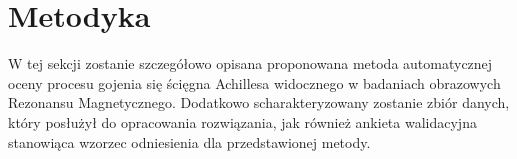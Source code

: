    







\section{Metodyka}

W tej sekcji zostanie szczegółowo opisana proponowana metoda automatycznej oceny procesu gojenia się ścięgna Achillesa widocznego w badaniach obrazowych Rezonansu Magnetycznego. Dodatkowo scharakteryzowany zostanie zbiór danych, który posłużył do opracowania rozwiązania, jak również ankieta walidacyjna stanowiąca wzorzec odniesienia dla przedstawionej metody. 

